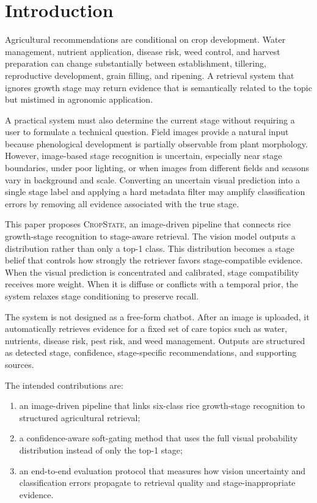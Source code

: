 \documentclass[conference]{IEEEtran}
\newcommand{\method}{\textsc{CropState}}
\begin{document}
\section{Introduction}
Agricultural recommendations are conditional on crop development. Water management, nutrient application, disease risk, weed control, and harvest preparation can change substantially between establishment, tillering, reproductive development, grain filling, and ripening. A retrieval system that ignores growth stage may return evidence that is semantically related to the topic but mistimed in agronomic application.

A practical system must also determine the current stage without requiring a user to formulate a technical question. Field images provide a natural input because phenological development is partially observable from plant morphology. However, image-based stage recognition is uncertain, especially near stage boundaries, under poor lighting, or when images from different fields and seasons vary in background and scale. Converting an uncertain visual prediction into a single stage label and applying a hard metadata filter may amplify classification errors by removing all evidence associated with the true stage.

This paper proposes \method, an image-driven pipeline that connects rice growth-stage recognition to stage-aware retrieval. The vision model outputs a distribution rather than only a top-1 class. This distribution becomes a stage belief that controls how strongly the retriever favors stage-compatible evidence. When the visual prediction is concentrated and calibrated, stage compatibility receives more weight. When it is diffuse or conflicts with a temporal prior, the system relaxes stage conditioning to preserve recall.

The system is not designed as a free-form chatbot. After an image is uploaded, it automatically retrieves evidence for a fixed set of care topics such as water, nutrients, disease risk, pest risk, and weed management. Outputs are structured as detected stage, confidence, stage-specific recommendations, and supporting sources.

The intended contributions are:
\begin{enumerate}[leftmargin=*,nosep]
    \item an image-driven pipeline that links six-class rice growth-stage recognition to structured agricultural retrieval;
    \item a confidence-aware soft-gating method that uses the full visual probability distribution instead of only the top-1 stage;
    \item an end-to-end evaluation protocol that measures how vision uncertainty and classification errors propagate to retrieval quality and stage-inappropriate evidence.
\end{enumerate}
\end{document}

